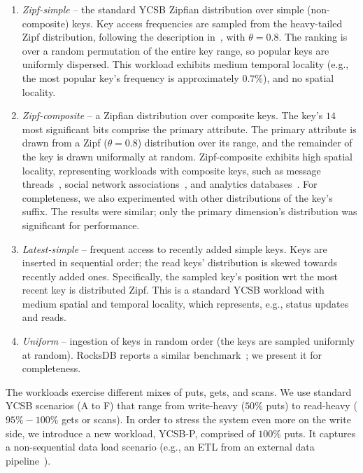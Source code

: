 \begin{enumerate}
\item {\em Zipf-simple} -- the standard YCSB Zipfian distribution over simple (non-composite) keys. 
Key access frequencies are sampled from the heavy-tailed Zipf distribution, 
following the description in~\cite{Gray:1994:QGB:191839.191886}, with $\theta = 0.8$. 
The ranking is over a random permutation of the entire key range, so popular keys are uniformly dispersed.
This workload exhibits 
medium temporal locality (e.g., the most popular key's frequency is approximately $0.7\%$), 
and no spatial locality. 

\item {\em Zipf-composite}  -- a Zipfian distribution over composite keys. 
The key's $14$ most significant bits comprise the primary attribute. 
The primary attribute is drawn from a Zipf ($\theta=0.8$) distribution over its range, 
and  the remainder of the key is drawn uniformally at random.
Zipf-composite exhibits high spatial locality, representing workloads 
with composite keys, such as message threads~\cite{Borthakur:2011:AHG:1989323.1989438},
social network associations~\cite{Armstrong:2013:LDB:2463676.2465296}, and analytics databases~\cite{flurry}. 
For completeness, we also experimented with other distributions of the key's suffix. 
The results were similar; only the primary dimension's distribution was significant for performance.

\item {\em Latest-simple} -- frequent access to recently added simple keys. 
Keys are inserted in sequential  order; the read keys' distribution is skewed towards recently added ones. 
Specifically, the sampled key's position wrt the most recent key is distributed Zipf. This is a 
standard YCSB workload with medium spatial and temporal locality, which represents, e.g., status updates and reads. 

\item {\em Uniform} -- ingestion of keys in random order (the keys are sampled uniformly at random). RocksDB
reports a similar benchmark~\cite{rocksdb-benchmarks}; we present it for completeness.

\end{enumerate}

The workloads exercise different mixes of puts, gets, and scans. We use standard YCSB scenarios 
(A to F) that range from write-heavy ($50\%$ puts) to read-heavy ($95\%-100\%$ gets or scans). 
In order to stress the system even more on the write side, we introduce a new workload,  
YCSB-P, comprised of $100\%$ puts. It captures a non-sequential data load scenario (e.g., an ETL 
from an external data pipeline~\cite{flurry}). 

